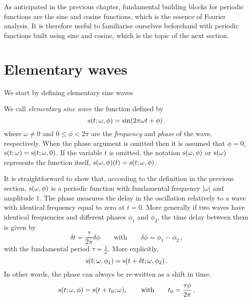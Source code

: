 As anticipated in the previous chapter, fundamental building blocks for periodic functions
are the sine and cosine functions, which is the essence of Fourier analysis. It is
therefore useful to familiarise ourselves beforehand with periodic functions built using
sine and cosine, which is the topic of the next section.
\section{Elementary waves}
We start by defining elementary sine waves
\begin{definition}
  \label{def:sine-wave}
  We call \emph{elementary sine wave} the function defined by
  \begin{equation}
    \operatorname{s}(t;\omega,\phi)=\sin(2\pi\omega t + \phi)\,.\label{eq:sine-wave}
  \end{equation}
  where $\omega\neq 0$ and $0\leq\phi<2\pi$ are the \emph{frequency} and \emph{phase} of
  the wave, respectively. When the phase argument is omitted then it is assumed that
  $\phi=0$, \ie $\operatorname{s}(t;\omega)=\operatorname{s}(t;\omega,0)$. If the variable $t$ is omitted, the
  notation $\operatorname{s}(\omega,\phi)$ or $\operatorname{s}(\omega)$ represents the function itself, \ie
  $\operatorname{s}(\omega,\phi)(t)=\operatorname{s}(t;\omega,\phi)$.
\end{definition}
\noindent It is straightforward to show that, according to the definition in the previous
section, $\operatorname{s}(\omega,\phi)$ is a periodic function with fundamental frequency $|\omega|$
and amplitude $1$. The phase measures the delay in the oscillation relatively to a wave
with identical frequency equal to zero at $t=0$. More generally if two waves have
identical frequencies and different phases $\phi_1$ and $\phi_2$, the time delay between
them is given by
\begin{equation}
  \delta t =\frac{\tau}{2\pi}\delta\phi\qquad\text{with}\qquad\delta\phi=\phi_1-\phi_2\,,
\end{equation}
with the fundamental period $\tau=\frac{1}{\omega}$. More explicitly,
\begin{equation}
  \operatorname{s}(t;\omega,\phi_1)=\operatorname{s}(t+\delta t;\omega,\phi_2)\,.
\end{equation}
In other words, the phase can always be re-written as a shift in time:
\begin{equation}
  \operatorname{s}(t;\omega,\phi)=\operatorname{s}(t+t_0;\omega),
  \qquad\text{with}\qquad
  t_0 = \frac{\tau\phi}{2\pi}\,.\label{eq:phase-delay}
\end{equation}
